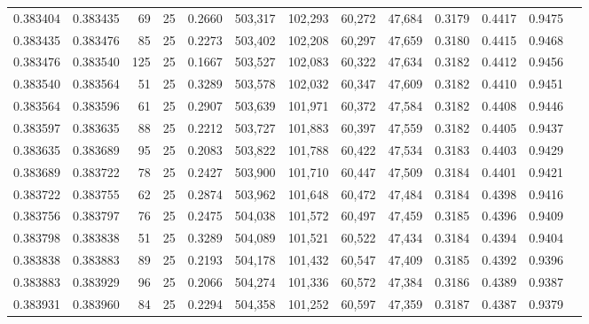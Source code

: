 \begin{tabular}{rrrrrrrrrrrrr}
0.383404 & 0.383435 &    69 &  25 &                                     0.2660 & 503,317 & 102,293 &  60,272 &  47,684 & 0.3179 & 0.4417 & 0.9475 \\
0.383435 & 0.383476 &    85 &  25 &                                     0.2273 & 503,402 & 102,208 &  60,297 &  47,659 & 0.3180 & 0.4415 & 0.9468 \\
0.383476 & 0.383540 &   125 &  25 &                                     0.1667 & 503,527 & 102,083 &  60,322 &  47,634 & 0.3182 & 0.4412 & 0.9456 \\
0.383540 & 0.383564 &    51 &  25 &                                     0.3289 & 503,578 & 102,032 &  60,347 &  47,609 & 0.3182 & 0.4410 & 0.9451 \\
0.383564 & 0.383596 &    61 &  25 &                                     0.2907 & 503,639 & 101,971 &  60,372 &  47,584 & 0.3182 & 0.4408 & 0.9446 \\
0.383597 & 0.383635 &    88 &  25 &                                     0.2212 & 503,727 & 101,883 &  60,397 &  47,559 & 0.3182 & 0.4405 & 0.9437 \\
0.383635 & 0.383689 &    95 &  25 &                                     0.2083 & 503,822 & 101,788 &  60,422 &  47,534 & 0.3183 & 0.4403 & 0.9429 \\
0.383689 & 0.383722 &    78 &  25 &                                     0.2427 & 503,900 & 101,710 &  60,447 &  47,509 & 0.3184 & 0.4401 & 0.9421 \\
0.383722 & 0.383755 &    62 &  25 &                                     0.2874 & 503,962 & 101,648 &  60,472 &  47,484 & 0.3184 & 0.4398 & 0.9416 \\
0.383756 & 0.383797 &    76 &  25 &                                     0.2475 & 504,038 & 101,572 &  60,497 &  47,459 & 0.3185 & 0.4396 & 0.9409 \\
0.383798 & 0.383838 &    51 &  25 &                                     0.3289 & 504,089 & 101,521 &  60,522 &  47,434 & 0.3184 & 0.4394 & 0.9404 \\
0.383838 & 0.383883 &    89 &  25 &                                     0.2193 & 504,178 & 101,432 &  60,547 &  47,409 & 0.3185 & 0.4392 & 0.9396 \\
0.383883 & 0.383929 &    96 &  25 &                                     0.2066 & 504,274 & 101,336 &  60,572 &  47,384 & 0.3186 & 0.4389 & 0.9387 \\
0.383931 & 0.383960 &    84 &  25 &                                     0.2294 & 504,358 & 101,252 &  60,597 &  47,359 & 0.3187 & 0.4387 & 0.9379 \\

\end{tabular}
